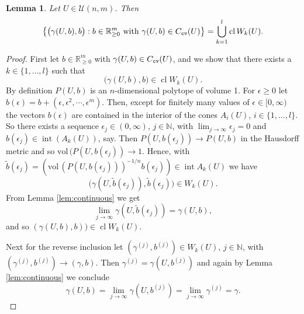 \documentclass[11pt, a4paper, twoside, reqno]{amsart}
\DeclareMathOperator*{\cl}{cl}
\DeclareMathOperator*{\inter}{int}
\newcommand{\R}{\mathbb{R}}
\newcommand{\N}{\mathbb{N}}
\newtheorem{lemma}[theorem]{Lemma}
\theoremstyle{definition}
\theoremstyle{remark}
\newcommand{\vol}{\mathrm{vol}\,}
\newcommand{\cv}{{\tt cv}}
\numberwithin{equation}{section}
\begin{document}
\begin{lemma} Let $U\in\mathcal{U}(n,m)$. Then
  \begin{equation}
  \left\{   \big(\gamma(U,b), b\big) : b\in\R^m_{\geq 0} \text{ with }\gamma(U,b)\in C_\cv(U)     \right\} =\bigcup_{k=1}^l \cl W_k(U).
\label{eq:mainset}
\end{equation}%
\label{lem:lemmasemi}
\end{lemma} 
\begin{proof} First let $b\in\R^m_{\geq 0}$ with  $\gamma(U,b)\in
  C_\cv(U)$, and we show that there exists a $k\in\{1,\dots,l\}$ such that
\begin{equation*}
         \big(\gamma(U,b), b\big)\in \cl W_k(U).
       \end{equation*}
By definition $P(U,b)$ is an $n$-dimensional polytope of volume 1. For $\epsilon\geq 0$ let $b(\epsilon)=b+(\epsilon,\epsilon^2,\cdots,\epsilon^m)$. Then, except for finitely many values of  $\epsilon\in[0,\infty)$ the vectors $b(\epsilon)$ are contained in the interior of the cones $A_i(U)$, $i\in\{1,\dots,l\}$. So there exists a sequence  $\epsilon_j\in (0,\infty)$, $j\in\N$, with $\lim_{j\to\infty} \epsilon_j= 0$ and $b(\epsilon_j)\in \inter( A_k(U))$, say.
  Then $P(U,b(\epsilon_j))\to P(U,b)$ in the Hausdorff metric and so $\vol(P(U,b(\epsilon_j))\to 1$. Hence, with $\widetilde{b}(\epsilon_j)=(\vol(P(U,b(\epsilon_j)))^{-1/n}b(\epsilon_j))\in\inter A_k(U)$  we have
  \begin{equation*}
       \big( \gamma(U, \widetilde{b}(\epsilon_j)), \widetilde{b}(\epsilon_j)\big)\in W_k(U).
     \end{equation*}
From Lemma \ref{lem:continuous} we get
     \begin{equation*}
   \lim_{j\to\infty} \gamma(U, \widetilde{b}(\epsilon_j)) = \gamma(U,b),
 \end{equation*}
 and so $(\gamma(U,b),b))\in\cl W_k(U)$.

 Next for the reverse inclusion let $(\gamma^{(j)},b^{(j)})\in W_k(U)$, $j\in\N$, with $(\gamma^{(j)},b^{(j)})\to  (\gamma,b)$.
  Then $\gamma^{(j)}=\gamma(U,b^{(j)})$ and again by Lemma \ref{lem:continuous} we conclude
  \begin{equation*}
    \gamma(U,b)=\lim_{j\to\infty} \gamma(U,b^{(j)}) =\lim_{j\to\infty}\gamma^{(j)} = \gamma.
  \end{equation*}
\end{proof}
\end{document}

